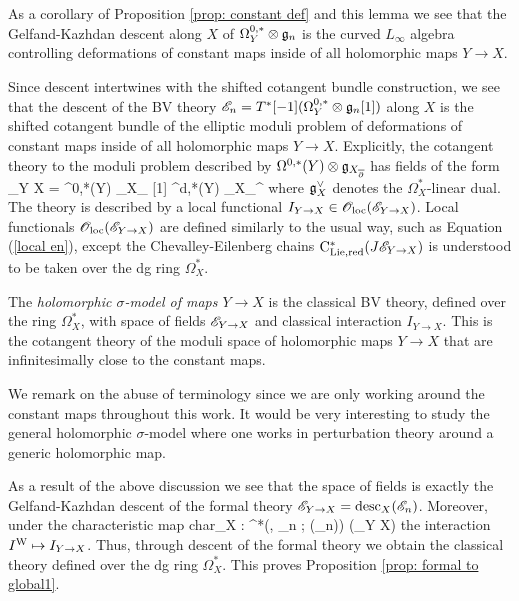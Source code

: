 As a corollary of Proposition \ref{prop: constant def} and this lemma we see that the Gelfand-Kazhdan descent along $X$ of $\Omega^{0,*}_Y \otimes \mathfrak g_n$ is the curved $L_\infty$ algebra controlling deformations of constant maps inside of all holomorphic maps $Y \to X$.

Since descent intertwines with the shifted cotangent bundle construction, we see that the descent of the BV theory $\mathscr E_n = T^*[-1] (\Omega^{0,*}_Y \otimes \mathfrak g_n[1])$ along $X$ is the shifted cotangent bundle of the elliptic moduli problem of deformations of constant maps inside of all holomorphic maps $Y \to X$.
Explicitly, the cotangent theory to the moduli problem described by $\Omega^{0,*}(Y) \otimes \mathfrak g_{X_{\overline{\partial}}}$ has fields of the form
\ben
\sE_{Y \to X} = \Omega^{0,*}(Y) \tensor \fg_{X_{\dbar}} [1] \oplus \Omega^{d,*}(Y) \tensor \fg_{X_{\dbar}}^\vee [-2]
\een
where $\mathfrak g_X^{\vee}$ denotes the $\Omega^*_X$-linear dual.
The theory is described by a local functional $I_{Y \to X} \in {\mathscr O}_{\rm loc}(\mathscr E_{Y \to X})$.
Local functionals ${\mathscr O}_{\rm loc}(\mathscr E_{Y\to X})$ are defined similarly to the usual way, such as Equation (\ref{local en}), except the Chevalley-Eilenberg chains ${\rm C}_{\rm Lie, red}^*(J \mathscr E_{Y \to X})$ is understood to be taken over the dg ring $\Omega^*_X$. 

\begin{dfn}
The {\em holomorphic $\sigma$-model of maps $Y \to X$} is the classical BV theory, defined over the ring $\Omega^*_X$, with space of fields $\mathscr E_{Y \to X}$ and classical interaction $I_{Y \to X}$. 
This is the cotangent theory of the moduli space of holomorphic maps $Y \to X$ that are infinitesimally close to the constant maps.
\end{dfn}

\begin{rmk}
We remark on the abuse of terminology since we are only working around the constant maps throughout this work.
It would be very interesting to study the general holomorphic $\sigma$-model where one works in perturbation theory around a generic holomorphic map.
\end{rmk}

As a result of the above discussion we see that the space of fields is exactly the Gelfand-Kazhdan descent of the formal theory $\mathscr E_{Y \to X} = {\rm desc}_X(\mathscr E_n)$. 
Moreover, under the characteristic map 
\ben
{\rm char}_X : \clie^*(\Vect , \GL_n ; \oloc(\sE_n)) \to \oloc(\sE_{Y \to X})
\een
the interaction $I^{\rm W} \mapsto I_{Y \to X}$. 
Thus, through descent of the formal theory we obtain the classical theory defined over the dg ring $\Omega^*_X$. 
This proves Proposition \ref{prop: formal to global1}.

